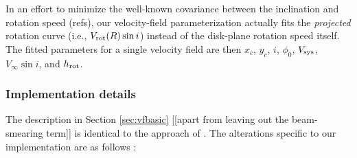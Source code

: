 \documentclass[apj,iop,revtex4,numberedappendix]{emulateapj}
\begin{document}
In an effort to minimize the well-known covariance between the
inclination and rotation speed (refs), our velocity-field
parameterization actually fits the {\em projected} rotation curve (i.e.,
$V_{\rm rot}(R) \sin i$) instead of the disk-plane rotation speed
itself.  The fitted parameters for a single velocity field are then
$x_c$, $y_c$, $i$, $\phi_0$, $V_{\rm sys}$, $V_\infty \sin i$, and
$h_{\rm rot}$.

\subsubsection{Implementation details}
\label{sec:vfimplement}

The description in Section \ref{sec:vfbasic} [[apart from leaving out
the beam-smearing term]] is identical to the approach of
\citet{2013ApJ...768...41A}.  The alterations specific to our
implementation are as follows \citep[cf.][]{2011ApJ...742...18W}:
\end{document}
